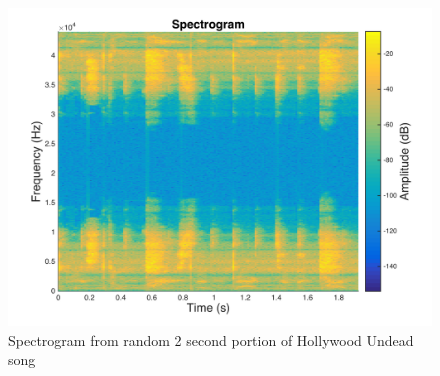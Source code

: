 \documentclass{article}[12pt]
\begin{document}
\begin{figure}[h]
\includegraphics[scale=0.35]{music_clip1_spectrogram}
\centering
\caption{Spectrogram from random 2 second portion of Hollywood Undead song}
\centering
\end{figure}
\end{document}
